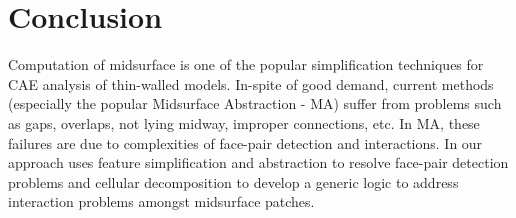 \section{Conclusion}

Computation of midsurface is one of the popular simplification techniques for CAE analysis of  thin-walled models. In-spite of good demand, current methods (especially the popular Midsurface Abstraction - MA) suffer from problems such as gaps, overlaps, not lying midway, improper connections, etc.  In MA, these failures are due to complexities of face-pair detection and interactions. In our approach uses feature simplification and abstraction to resolve face-pair detection problems and  cellular decomposition to develop a generic logic to address interaction problems amongst midsurface patches. 


\begin{figure}[htp]
\centering     %
{} \quad
{}\quad
{} \quad
{}
\end{figure}


